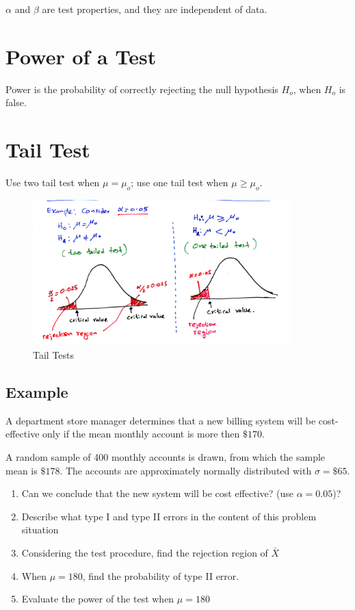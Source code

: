 \documentclass{article}
\begin{document}
        $\alpha$ and $\beta$ are test properties, and they are independent of data.

        \section*{Power of a Test}
        Power is the probability of correctly rejecting the null hypothesis 
        $H_{o}$, when $H_{o}$ is false. 

        \section*{Tail Test}
        Use two tail test when $\mu = \mu_{o}$; use one tail test when $\mu \geq \mu_{o}$.
        \begin{figure}[H]
            \centering
            \includegraphics[width=10cm]{figures/tail_test.PNG}
            \caption{Tail Tests}
            \label{fig:tail_test}
        \end{figure}


        \subsection*{Example}
        A department store manager determines that a new billing system will be cost-effective 
        only if the mean monthly account is more then $\$170$.\par

        A random sample of 400 monthly accounts is drawn, from which the sample mean 
        is $\$178$. The accounts are approximately normally distributed with $\sigma = \$65$.

        \begin{enumerate}[label={(\alph*)}]
            \item Can we conclude that the new system will be cost effective? (use $\alpha = 0.05$)?
            \item Describe what type I and type II errors in the content of this problem situation
            \item Considering the test procedure, find the rejection region of $\bar{X}$
            \item When $\mu = 180$, find the probability of type II error.
            \item Evaluate the power of the test when $\mu = 180$
        \end{enumerate}
\end{document}
